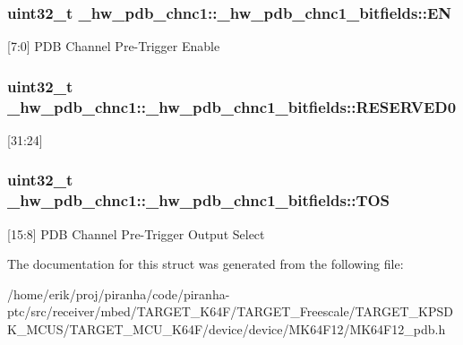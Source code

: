 \subsubsection[{\texorpdfstring{EN}{EN}}]{\setlength{\rightskip}{0pt plus 5cm}uint32\+\_\+t \+\_\+hw\+\_\+pdb\+\_\+chnc1\+::\+\_\+hw\+\_\+pdb\+\_\+chnc1\+\_\+bitfields\+::\+EN}\hypertarget{struct__hw__pdb__chnc1_1_1__hw__pdb__chnc1__bitfields_a80438054d954603be54f7017eb17040b}{}\label{struct__hw__pdb__chnc1_1_1__hw__pdb__chnc1__bitfields_a80438054d954603be54f7017eb17040b}
\mbox{[}7\+:0\mbox{]} P\+DB Channel Pre-\/\+Trigger Enable 
\subsubsection[{\texorpdfstring{R\+E\+S\+E\+R\+V\+E\+D0}{RESERVED0}}]{\setlength{\rightskip}{0pt plus 5cm}uint32\+\_\+t \+\_\+hw\+\_\+pdb\+\_\+chnc1\+::\+\_\+hw\+\_\+pdb\+\_\+chnc1\+\_\+bitfields\+::\+R\+E\+S\+E\+R\+V\+E\+D0}\hypertarget{struct__hw__pdb__chnc1_1_1__hw__pdb__chnc1__bitfields_af85e26a6185af5f9c6b8feeed6dd5421}{}\label{struct__hw__pdb__chnc1_1_1__hw__pdb__chnc1__bitfields_af85e26a6185af5f9c6b8feeed6dd5421}
\mbox{[}31\+:24\mbox{]} 
\subsubsection[{\texorpdfstring{T\+OS}{TOS}}]{\setlength{\rightskip}{0pt plus 5cm}uint32\+\_\+t \+\_\+hw\+\_\+pdb\+\_\+chnc1\+::\+\_\+hw\+\_\+pdb\+\_\+chnc1\+\_\+bitfields\+::\+T\+OS}\hypertarget{struct__hw__pdb__chnc1_1_1__hw__pdb__chnc1__bitfields_a4888a8c7af688c5b557d3e363f4b6a15}{}\label{struct__hw__pdb__chnc1_1_1__hw__pdb__chnc1__bitfields_a4888a8c7af688c5b557d3e363f4b6a15}
\mbox{[}15\+:8\mbox{]} P\+DB Channel Pre-\/\+Trigger Output Select 

The documentation for this struct was generated from the following file\+:\begin{DoxyCompactItemize}
\item 
/home/erik/proj/piranha/code/piranha-\/ptc/src/receiver/mbed/\+T\+A\+R\+G\+E\+T\+\_\+\+K64\+F/\+T\+A\+R\+G\+E\+T\+\_\+\+Freescale/\+T\+A\+R\+G\+E\+T\+\_\+\+K\+P\+S\+D\+K\+\_\+\+M\+C\+U\+S/\+T\+A\+R\+G\+E\+T\+\_\+\+M\+C\+U\+\_\+\+K64\+F/device/device/\+M\+K64\+F12/M\+K64\+F12\+\_\+pdb.\+h\end{DoxyCompactItemize}
